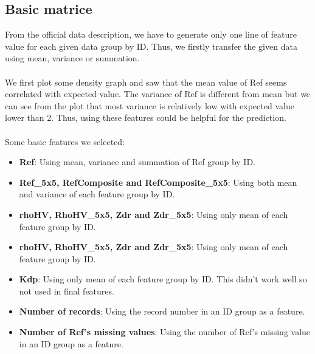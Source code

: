 \documentclass{article} %
\begin{document}
\subsection{Basic matrice}
From the official data description, we have to generate only one line of feature value for each given data group by ID. Thus, we firstly transfer the given data using mean, variance or summation.\\
\\
We first plot some density graph and saw that the mean value of Ref seems correlated with expected value. The variance of Ref is different from mean but we can see from the plot that most variance is relatively low with expected value lower than 2. Thus, using these features could be helpful for the prediction.\\
\\
Some basic features we selected:
\begin{itemize}
\item\textbf{Ref}: Using mean, variance and summation of Ref group by ID.
\item\textbf{Ref\_5x5, RefComposite and RefComposite\_5x5}: Using both mean and variance of each feature group by ID.
\item\textbf{rhoHV, RhoHV\_5x5, Zdr and Zdr\_5x5}: Using only mean of each feature group by ID.
\item\textbf{rhoHV, RhoHV\_5x5, Zdr and Zdr\_5x5}: Using only mean of each feature group by ID.
\item\textbf{Kdp}: Using only mean of each feature group by ID. This didn't work well so not used in final features.
\item\textbf{Number of records}: Using the record number in an ID group as a feature.
\item\textbf{Number of Ref's missing values}: Using the number of Ref's missing value in an ID group as a feature.
\end{itemize}
\end{document}
